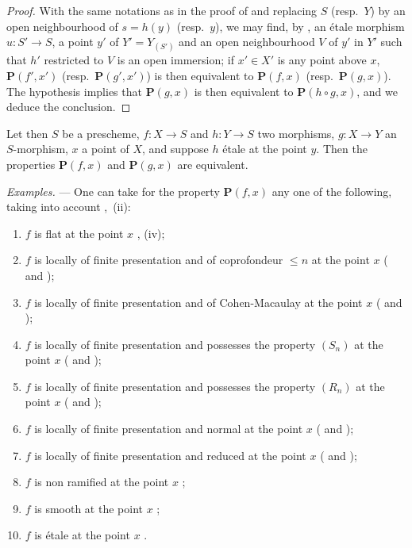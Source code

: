 \begin{proof}
With the same notations as in the proof of  and replacing $S$ (resp.\ $Y$) by an open neighbourhood of $s=h(y)$ (resp.\ $y$), we may find, by , an \'etale morphism $u:S'\to S$, a point $y'$ of $Y'=Y_{(S')}$ and an open neighbourhood $V$ of $y'$ in $Y'$ such that $h'$ restricted to $V$ is an open immersion;
if $x'\in X'$ is any point above $x$, $\mathbf{P}(f',x')$ (resp.\ $\mathbf{P}(g',x')$) is then equivalent to $\mathbf{P}(f,x)$ (resp.\ $\mathbf{P}(g,x)$).
The hypothesis implies that $\mathbf{P}(g,x)$ is then equivalent to $\mathbf{P}(h\circ g,x)$, and we deduce the conclusion.
\end{proof}

Let then $S$ be a prescheme, $f:X\to S$ and $h:Y\to S$ two morphisms, $g:X\to Y$ an $S$-morphism, $x$ a point of $X$, and suppose $h$ \'etale at the point $y$.
Then the properties $\mathbf{P}(f,x)$ and $\mathbf{P}(g,x)$ are equivalent.

\begin{env}[18.4.11]
\label{IV.18.4.11}
\emph{Examples.} ---
One can take for the property $\mathbf{P}(f,x)$ any one of the following, taking into account ,~(ii):
\begin{enumerate}
  \item[(i)] $f$ is flat at the point $x$ , (iv);
  \item[(ii)] $f$ is locally of finite presentation and of coprofondeur $\leq n$ at the point $x$ ( and );
  \item[(iii)] $f$ is locally of finite presentation and of Cohen-Macaulay at the point $x$ ( and );
  \item[(iv)] $f$ is locally of finite presentation and possesses the property $(S_n)$ at the point $x$ ( and );
  \item[(v)] $f$ is locally of finite presentation and possesses the property $(R_n)$ at the point $x$ ( and );
  \item[(vi)] $f$ is locally of finite presentation and normal at the point $x$ ( and );
  \item[(vii)] $f$ is locally of finite presentation and reduced at the point $x$ ( and );
  \item[(viii)] $f$ is non ramified at the point $x$ ;
  \item[(ix)] $f$ is smooth at the point $x$ ;
  \item[(x)] $f$ is \'etale at the point $x$ .
\end{enumerate}
\end{env}

